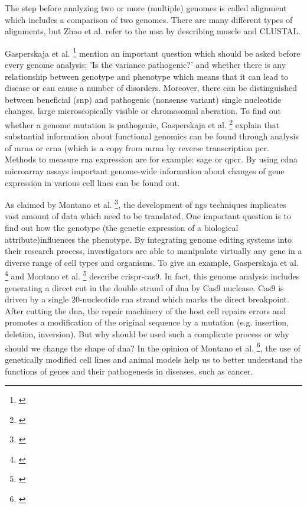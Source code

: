 The step before analyzing two or more (multiple) genomes is called alignment which includes a comparison of two genomes. There are many different types of alignments, but Zhao et al. refer to the \gls{msa} by describing \gls{muscle} and CLUSTAL.

Gasperskaja et al. \footnote{\autocite{gasperskaja_2017}} mention an important question which should be asked before every genome analysis: 'Is the variance pathogenic?' and whether there is any relationship between genotype and phenotype which means that it can lead to disease or can cause a number of disorders. 
Moreover, there can be distinguished between beneficial (\gls{snp}) and pathogenic (nonsense variant) single nucleotide changes, large microscopically visible or chromosomal aberation. 
To find out whether a genome mutation is pathogenic, Gasperskaja et al. \footnote{\autocite{gasperskaja_2017}} explain that substantial information about functional genomics can be found through analysis of \gls{mrna} or \gls{crna} (which is a copy from \gls{mrna} by reverse transcription \gls{pcr}.
Methods to measure \gls{rna} expression are for example: \gls{sage} or \gls{qpcr}.
By using \gls{cdna} microarray assays important genome-wide information about changes of gene expression in various cell lines can be found out.

As claimed by Montano et al. \footnote{\autocite{montano_2018}}, the development of \gls{ngs} techniques implicates vast amount of data which need to be translated. One important question is to find out how the genotype (the genetic expression of a biological attribute)influences the phenotype. By integrating genome editing systems into their research process, investigators are able to manipulate virtually any gene in a diverse range of cell types and organisms.
To give an example, Gasperskaja et al. \footnote{\autocite{gasperskaja_2017}} and Montano et al. \footnote{\autocite{montano_2018}} describe \gls{crispr-cas9}. In fact, this genome analysis includes generating a direct cut in the double strand of \gls{dna} by Cas9 nuclease. Cas9 is driven by a single 20-nucleotide \gls{rna} strand which marks the direct breakpoint. After cutting the \gls{dna}, the repair machinery of the host cell repairs errors and promotes a modification of the original sequence by a mutation (e.g. insertion, deletion, inversion).
But why should be used such a complicate process or why should we change the shape of \gls{dna}?
In the opinion of Montano et al. \footnote{\autocite{montano_2018}}, the use of genetically modified cell lines and animal models help us to better understand the functions of genes and their pathogenesis in diseases, such as cancer.
   


